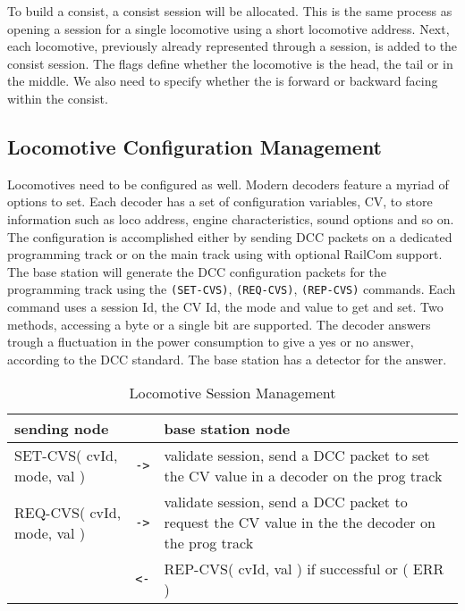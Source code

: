 To build a consist, a consist session will be allocated. This is the same process as opening a session for a single locomotive using a short locomotive address. Next, each locomotive, previously already represented through a session, is added to the consist session. The flags define whether the locomotive is the head, the tail or in the middle. We also need to specify whether the is forward or backward facing within the consist.

\subsection{Locomotive Configuration Management}

Locomotives need to be configured as well. Modern decoders feature a myriad of options to set. Each decoder has a set of configuration variables, CV, to store information such as loco address, engine characteristics, sound options and so on. The configuration is accomplished either by sending DCC packets on a dedicated programming track or on the main track using with optional RailCom support. The base station will generate the DCC configuration packets for the programming track using the \texttt{(SET-CVS)}, \texttt{(REQ-CVS)}, \texttt{(REP-CVS)} commands. Each command uses a session Id, the CV Id, the mode and value to get and set. Two methods, accessing a byte or a single bit are supported. The decoder answers trough a fluctuation in the power consumption to give a yes or no answer, according to the DCC standard. The base station has a detector for the answer.

\begin{table}[ht!]
    \begin{center}
        \caption{Locomotive Session Management}
        \begin{tabular}{|p{}| c |p{}|}
            \toprule
            \textbf{sending node} & & \textbf{ base station node} \\
            \midrule
            SET-CVS( cvId, mode, val ) & \texttt{->} & validate session, send a DCC packet to set the CV value in a decoder on the prog track \\
            \midrule
            REQ-CVS( cvId, mode, val ) & \texttt{->} & validate session, send a DCC packet to request the CV value in the the decoder on the prog track \\
            & \texttt{<-} & REP-CVS( cvId, val ) if successful or ( ERR ) \\ 
            \bottomrule
        \end{tabular}
    \end{center}
\end{table}

